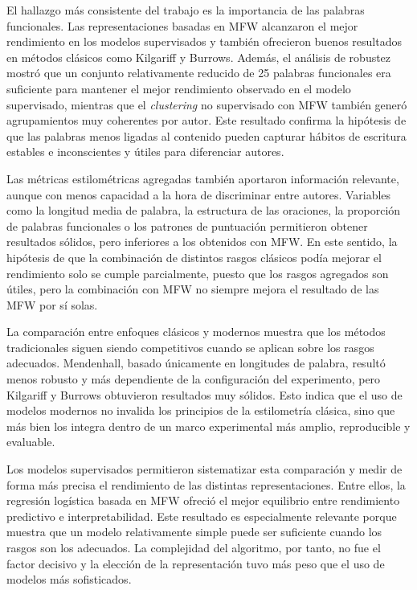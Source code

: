 \documentclass[IB]{TFUOC}%
\begin{document}
El hallazgo más consistente del trabajo es la importancia de las palabras funcionales. Las representaciones basadas en MFW alcanzaron el mejor rendimiento en los modelos supervisados y también ofrecieron buenos resultados en métodos clásicos como Kilgariff y Burrows. Además, el análisis de robustez mostró que un conjunto relativamente reducido de 25 palabras funcionales era suficiente para mantener el mejor rendimiento observado en el modelo supervisado, mientras que el \textit{clustering} no supervisado con MFW también generó agrupamientos muy coherentes por autor. Este resultado confirma la hipótesis de que las palabras menos ligadas al contenido pueden capturar hábitos de escritura estables e inconscientes y útiles para diferenciar autores.

Las métricas estilométricas agregadas también aportaron información relevante, aunque con menos capacidad a la hora de discriminar entre autores. Variables como la longitud media de palabra, la estructura de las oraciones, la proporción de palabras funcionales o los patrones de puntuación permitieron obtener resultados sólidos, pero inferiores a los obtenidos con MFW. En este sentido, la hipótesis de que la combinación de distintos rasgos clásicos podía mejorar el rendimiento solo se cumple parcialmente, puesto que los rasgos agregados son útiles, pero la combinación con MFW no siempre mejora el resultado de las MFW por sí solas.

La comparación entre enfoques clásicos y modernos muestra que los métodos tradicionales siguen siendo competitivos cuando se aplican sobre los rasgos adecuados. Mendenhall, basado únicamente en longitudes de palabra, resultó menos robusto y más dependiente de la configuración del experimento, pero Kilgariff y Burrows obtuvieron resultados muy sólidos. Esto indica que el uso de modelos modernos no invalida los principios de la estilometría clásica, sino que más bien los integra dentro de un marco experimental más amplio, reproducible y evaluable.

Los modelos supervisados permitieron sistematizar esta comparación y medir de forma más precisa el rendimiento de las distintas representaciones. Entre ellos, la regresión logística basada en MFW ofreció el mejor equilibrio entre rendimiento predictivo e interpretabilidad. Este resultado es especialmente relevante porque muestra que un modelo relativamente simple puede ser suficiente cuando los rasgos son los adecuados. La complejidad del algoritmo, por tanto, no fue el factor decisivo y la elección de la representación tuvo más peso que el uso de modelos más sofisticados.
\end{document}
